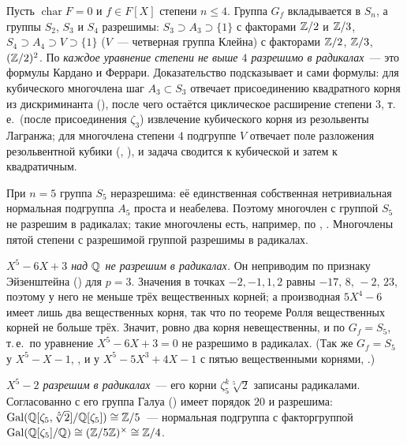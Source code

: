 \begin{aside}[5.35d]
Пусть $\operatorname{char}F=0$ и $f\in F[X]$ степени $n\le4$. Группа $G_f$ вкладывается в $S_n$, а группы $S_2$, $S_3$ и $S_4$
разрешимы: $S_3\supset A_3\supset\{1\}$ с факторами $\mathbb Z/2$ и $\mathbb Z/3$, $S_4\supset A_4\supset V\supset\{1\}$ ($V$~--- четверная
группа Клейна) с факторами $\mathbb Z/2$, $\mathbb Z/3$, $(\mathbb Z/2)^2$. По  \emph{каждое уравнение степени не выше $4$ разрешимо в
радикалах}~--- это формулы Кардано и Феррари. Доказательство  подсказывает и сами формулы: для кубического
многочлена шаг $A_3\subset S_3$ отвечает присоединению квадратного корня из дискриминанта (), после чего остаётся
циклическое расширение степени $3$, т.\,е.\ (после присоединения $\zeta_3$) извлечение кубического корня из резольвенты
Лагранжа; для многочлена степени $4$ подгруппе $V$ отвечает поле разложения резольвентной кубики (, ), и задача
сводится к кубической и затем к квадратичным.

При $n=5$ группа $S_5$ неразрешима: её единственная собственная нетривиальная нормальная подгруппа $A_5$ проста и
неабелева. Поэтому многочлен с группой $S_5$ не разрешим в радикалах; такие многочлены есть, например, по , .
Многочлены пятой степени с разрешимой группой разрешимы в радикалах.
\end{aside}

\begin{example}[5.35e]
\emph{$X^5-6X+3$ над $\mathbb Q$ не разрешим в радикалах.} Он неприводим по признаку Эйзенштейна () для $p=3$. Значения в
точках $-2,-1,1,2$ равны $-17,\,8,\,-2,\,23$, поэтому у него не меньше трёх вещественных корней; а производная $5X^4-6$ имеет
лишь два вещественных корня, так что по теореме Ролля вещественных корней не больше трёх. Значит, ровно два корня
невещественны, и по  $G_f=S_5$, т.\,е.\ по  уравнение $X^5-6X+3=0$ не разрешимо в радикалах. (Так же $G_f=S_5$ у
$X^5-X-1$, , и у $X^5-5X^3+4X-1$ с пятью вещественными корнями, .)

\emph{$X^5-2$ разрешим в радикалах}~--- его корни $\zeta_5^k\sqrt[5]2$ записаны радикалами. Согласованно с  его группа
Галуа () имеет порядок $20$ и разрешима: $\operatorname{Gal}(\mathbb Q[\zeta_5,\sqrt[5]2]/\mathbb Q[\zeta_5])\cong\mathbb Z/5$~--- нормальная подгруппа с
факторгруппой $\operatorname{Gal}(\mathbb Q[\zeta_5]/\mathbb Q)\cong(\mathbb Z/5\mathbb Z)^\times\cong\mathbb Z/4$.
\end{example}
